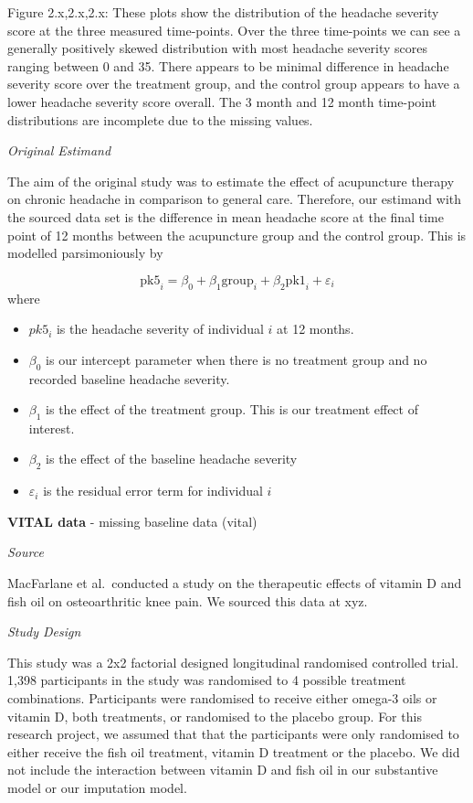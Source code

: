 \documentclass{article}
\providecommand{\tightlist}{%
  \setlength{\itemsep}{0pt}\setlength{\parskip}{0pt}}
\begin{document}
Figure 2.x,2.x,2.x: These plots show the distribution of the headache
severity score at the three measured time-points. Over the three
time-points we can see a generally positively skewed distribution with
most headache severity scores ranging between 0 and 35. There appears to
be minimal difference in headache severity score over the treatment
group, and the control group appears to have a lower headache severity
score overall. The 3 month and 12 month time-point distributions are
incomplete due to the missing values.

\emph{Original Estimand}

The aim of the original study was to estimate the effect of acupuncture
therapy on chronic headache in comparison to general care. Therefore,
our estimand with the sourced data set is the difference in mean
headache score at the final time point of 12 months between the
acupuncture group and the control group. This is modelled parsimoniously
by

\[\text{pk5}_i = \beta_0 + \beta_1 \text{group}_i + \beta_2 \text{pk1}_i + \varepsilon_i\]
where

\begin{itemize}
\tightlist
\item
  \(pk5_i\) is the headache severity of individual \(i\) at 12 months.
\item
  \(\beta_0\) is our intercept parameter when there is no treatment
  group and no recorded baseline headache severity.
\item
  \(\beta_1\) is the effect of the treatment group. This is our
  treatment effect of interest.
\item
  \(\beta_2\) is the effect of the baseline headache severity
\item
  \(\varepsilon_i\) is the residual error term for individual \(i\)
\end{itemize}

\textbf{VITAL data} - missing baseline data (vital)

\emph{Source}

MacFarlane et al.~conducted a study on the therapeutic effects of
vitamin D and fish oil on osteoarthritic knee pain. We sourced this data
at xyz.

\emph{Study Design}

This study was a 2x2 factorial designed longitudinal randomised
controlled trial. 1,398 participants in the study was randomised to 4
possible treatment combinations. Participants were randomised to receive
either omega-3 oils or vitamin D, both treatments, or randomised to the
placebo group. For this research project, we assumed that that the
participants were only randomised to either receive the fish oil
treatment, vitamin D treatment or the placebo. We did not include the
interaction between vitamin D and fish oil in our substantive model or
our imputation model.
\end{document}
